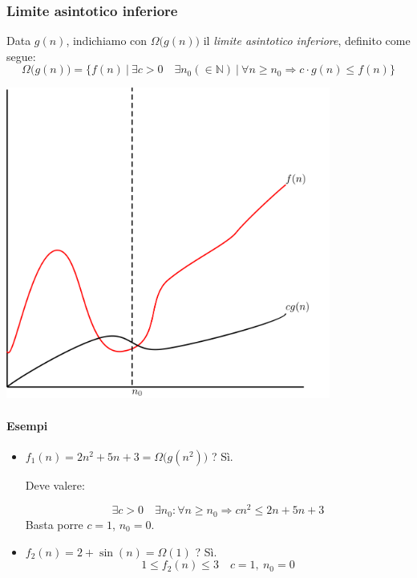\subsubsection{Limite asintotico inferiore}
Data $g(n)$, indichiamo con $\Omega \big(g(n) \big)$ il \emph{limite asintotico inferiore}, definito come segue:
\begin{displaymath}
	\Omega \big(g(n) \big) = \{ f(n) \ \vert \ \exists c > 0 \quad \exists n_0 (\in \mathbb{N}) \ \vert \ \forall n \geq n_0 \Rightarrow c \cdot g(n) \leq f(n) \}
\end{displaymath}

\begin{center}
	\includegraphics[width=0.80\textwidth]{img/plots/plotomega.png}
\end{center}

\paragraph{Esempi}
\begin{itemize}
	\item $f_1(n) = 2n^2 + 5n + 3 = \Omega \big(g(n^2) \big)$ ? Sì.\par
	Deve valere: \par
	\begin{displaymath}
		\exists c > 0 \quad \exists n_0 : \forall n \geq n_0 \Rightarrow cn^2 \leq 2n + 5n + 3
	\end{displaymath}
	Basta porre $c = 1$, $n_0 = 0$.
	
	\item $f_2(n) = 2 + \sin (n) = \Omega (1)$ ? Sì.
	\begin{displaymath}
		1 \leq f_2(n) \leq 3 \quad c = 1, \ n_0 = 0
	\end{displaymath}
\end{itemize}

